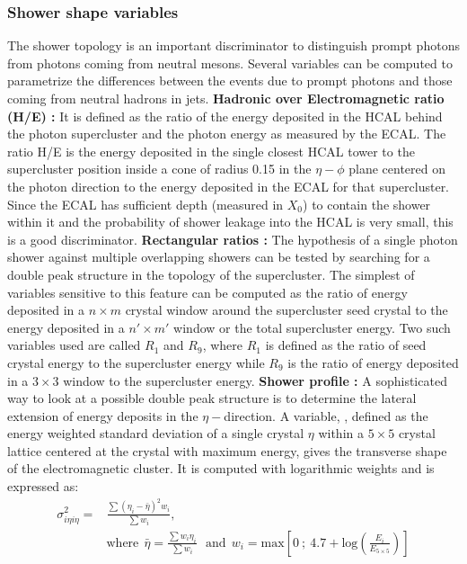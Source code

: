 \subsubsection{Shower shape variables}\label{section:ShowerShapeVariables}
The shower topology is an important discriminator to distinguish prompt photons from photons coming from neutral mesons. Several variables can be 
computed to parametrize the differences between the events due to prompt photons and those coming from neutral hadrons in jets.
\newline
{\bf Hadronic over Electromagnetic ratio (H/E) : } It is defined as the ratio of the energy deposited in the HCAL behind the photon supercluster and 
the photon energy as measured by the ECAL. The ratio H/E is the energy deposited in the single closest HCAL tower to the supercluster position 
inside a cone of radius 0.15 in the $\eta-\phi$ plane centered on the photon direction to the energy deposited in the ECAL for that supercluster. 
Since the ECAL has sufficient depth (measured in $X_{0}$) to contain the shower within it and the probability of shower leakage into the HCAL is 
very small, this is a good discriminator.
\newline
{\bf Rectangular ratios : }  The hypothesis of a single photon shower against multiple overlapping showers can be tested by searching for a double
peak structure in the topology of the supercluster. The simplest of variables sensitive to this feature can be computed as the ratio of energy 
deposited in a $n\times{m}$ crystal window around the supercluster seed crystal to the energy deposited in a $n'\times{m'}$ window  or the total
supercluster energy. Two such variables used are called $R_{1}$ and $R_{9}$, where $R_{1}$ is defined as the ratio of seed crystal energy to the 
supercluster energy while $R_{9}$ is the ratio of energy deposited in a $3\times3$ window to the supercluster energy.
\newline
{\bf Shower profile : } A sophisticated way to look at a possible double peak structure is to determine the lateral extension of energy deposits in the 
$\eta-$direction. A variable, \sigmaIetaIeta, defined as the energy weighted standard deviation of a single crystal $\eta$ within a $5\times5$ 
crystal lattice centered at the crystal with maximum energy, gives the transverse shape of the electromagnetic cluster. It is computed with 
logarithmic weights and is expressed as:
\begin{equation}
\begin{split}
\sigma_{i{\eta}i{\eta}}^{2} =  &\frac{{\sum}(\eta_{i}-\bar{\eta})^{2}w_{i}}{{\sum}w_{i}}, \\
                           &\text{where}\:\:\bar{\eta} = \frac{{\sum}w_{i}\eta_{i}}{{\sum}w_{i}} \:\:\: \text{and} \:\: w_{i} = \text{max}\left[0 \: ;\: 4.7+\text{log}\left(\frac{E_{i}}{E_{5\times5}}\right)\right]
\end{split}
\end{equation}
